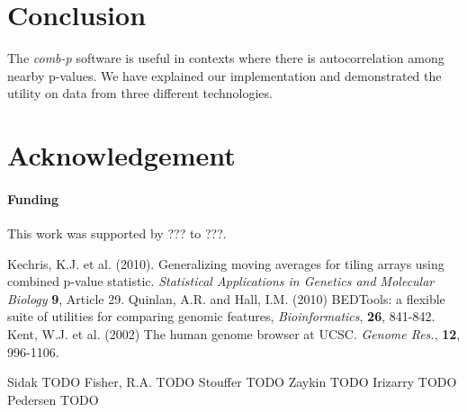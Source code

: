 \documentclass{bioinfo}
\begin{document}
\section{Conclusion}
The \textit{comb-p} software is useful in contexts where there is
autocorrelation among nearby p-values. We have explained our implementation
and demonstrated the utility on data from three different technologies.

\section*{Acknowledgement}

\paragraph{Funding\textcolon} This work was supported by ??? to ???.

%
%
%
%
%

%

%
\begin{thebibliography}{}
 Kechris, K.J. et al. (2010).
Generalizing moving averages for tiling arrays using combined p-value
statistic. {\it Statistical Applications in Genetics and Molecular Biology}
{\bf 9}, Article 29.
 Quinlan, A.R. and Hall, I.M. (2010) BEDTools: a flexible suite of utilities for comparing genomic features, {\it Bioinformatics}, {\bf 26}, 841-842.
 Kent, W.J. et al. (2002) The human genome browser at UCSC. {\it Genome Res.}, {\bf 12}, 996-1106.

 Sidak TODO
 Fisher, R.A. TODO
 Stouffer TODO
 Zaykin TODO
 Irizarry TODO
 Pedersen TODO

\end{thebibliography}
\end{document}
